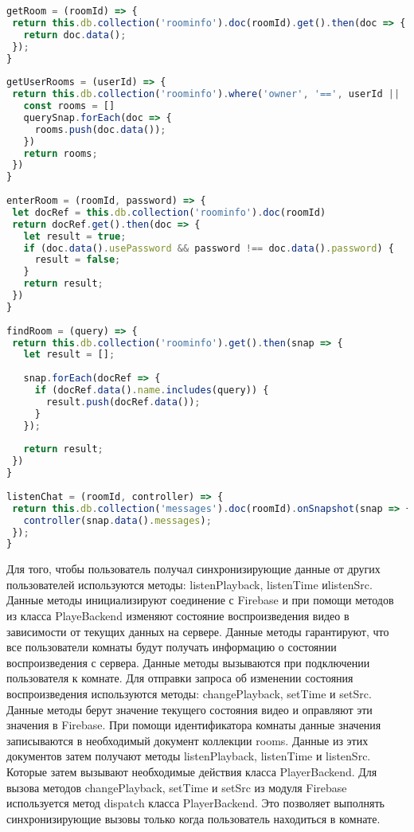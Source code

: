 \begin{lstlisting}[language=JavaScript,label={lst:firebase},caption={Методы для взаимодействия с Firebase}]
getRoom = (roomId) => {
 return this.db.collection('roominfo').doc(roomId).get().then(doc => {
   return doc.data();
 });
}
 
getUserRooms = (userId) => {
 return this.db.collection('roominfo').where('owner', '==', userId || '').get().then((querySnap) => {
   const rooms = []
   querySnap.forEach(doc => {
     rooms.push(doc.data());
   })
   return rooms;
 })
}
 
enterRoom = (roomId, password) => {
 let docRef = this.db.collection('roominfo').doc(roomId)
 return docRef.get().then(doc => {
   let result = true;
   if (doc.data().usePassword && password !== doc.data().password) {
     result = false;
   }
   return result;
 })
}
 
findRoom = (query) => {
 return this.db.collection('roominfo').get().then(snap => {
   let result = [];
 
   snap.forEach(docRef => {
     if (docRef.data().name.includes(query)) {
       result.push(docRef.data());
     }
   });
 
   return result;
 })
}
 
listenChat = (roomId, controller) => {
 return this.db.collection('messages').doc(roomId).onSnapshot(snap => {
   controller(snap.data().messages);
 });
}
\end{lstlisting}

Для того, чтобы пользователь получал синхронизирующие данные от других пользователей используются методы: listenPlayback, listenTime и\linebreak listenSrc. 
Данные методы инициализируют соединение с Firebase и при помощи методов из класса PlayeBackend изменяют состояние воспроизведения видео в зависимости от текущих данных на сервере. 
Данные методы гарантируют, что все пользователи комнаты будут получать информацию о состоянии воспроизведения с сервера. 
Данные методы вызываются при подключении пользователя к комнате. 
Для отправки запроса об изменении состояния воспроизведения используются методы: changePlayback, setTime и setSrc. 
Данные методы берут значение текущего состояния видео и оправляют эти значения в Firebase. 
При помощи идентификатора комнаты данные значения записываются в необходимый документ коллекции rooms. 
Данные из этих документов затем получают методы listenPlayback, listenTime и listenSrc. Которые затем вызывают необходимые действия класса PlayerBackend. 
Для вызова методов changePlayback, setTime и setSrc из модуля Firebase используется метод dispatch класса PlayerBackend. 
Это позволяет выполнять синхронизирующие вызовы только когда пользователь находиться в комнате.

